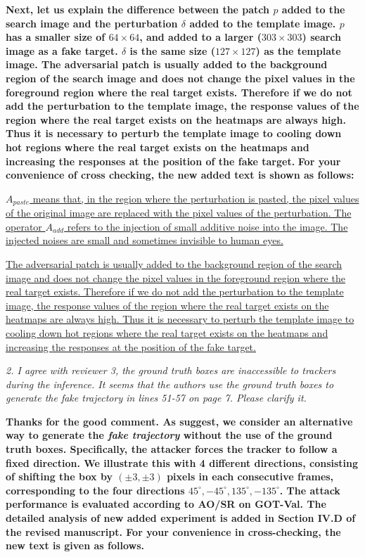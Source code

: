 \documentclass[12pt]{article}
\begin{document}
\textbf{Next, let us explain the difference between the patch $p$ added to the search image and the perturbation $\delta$ added to the template image. $p$ has a smaller size of $64\times 64$, and added to a larger ($303\times 303$) search image as a fake target.
$\delta$ is the same size ($127\times 127$) as the template image.
The adversarial patch is usually added to the background region of the search image and does not change the pixel values in the foreground region where the real target exists. Therefore if we do not add the perturbation to the template image, the response values of the region where the real target exists on the heatmaps are always high. Thus it is necessary to perturb the template image to cooling down hot regions where the real target exists on the heatmaps and increasing the responses at the position of the fake target.
}
\textbf{For your convenience of cross checking, the new added text is shown as follows:}

\uline{
$A_{paste}$ means that, in the region where the perturbation is pasted, the pixel values of the original image are replaced with the pixel values of the perturbation.
The operator $A_{add}$ refers to the injection of small additive noise into the image. The injected noises are small and sometimes invisible to human eyes.}

\uline{
The adversarial patch is usually added to the background region of the search image and does not change the pixel values in the foreground region where the real target exists. Therefore if we do not add the perturbation to the template image, the response values of the region where the real target exists on the heatmaps are always high. Thus it is necessary to perturb the template image to cooling down hot regions where the real target exists on the heatmaps and increasing the responses at the position of the fake target.
}


\textit{2. I agree with reviewer 3, the ground truth boxes are inaccessible to trackers during the inference. It seems that the authors use the ground truth boxes to generate the fake trajectory in lines 51-57 on page 7. Please clarify it.}

\textbf{
Thanks for the good comment. As suggest, we consider an alternative way to generate the \textit{fake trajectory} without the use of the ground truth boxes. Specifically, the attacker forces the tracker to follow a fixed direction. We illustrate this with 4 different directions, consisting of shifting the box by $(\pm 3, \pm 3)$ pixels in each consecutive frames, corresponding to the four directions $45^{\circ}, -45^{\circ}, 135^{\circ}, -135^{\circ}$.
The attack performance is evaluated according to AO/SR on GOT-Val.
The detailed analysis of new added experiment is added in Section IV.D of the revised manuscript. For your convenience in cross-checking, the new text is given as follows.}
\end{document}

